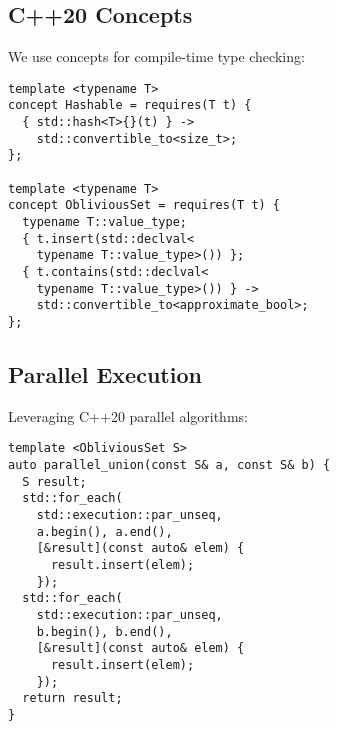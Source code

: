 \documentclass[10pt,conference]{IEEEtran}
\begin{document}
\subsection{C++20 Concepts}

We use concepts for compile-time type checking:

\begin{lstlisting}[caption={Type constraints using concepts}]
template <typename T>
concept Hashable = requires(T t) {
  { std::hash<T>{}(t) } ->
    std::convertible_to<size_t>;
};

template <typename T>
concept ObliviousSet = requires(T t) {
  typename T::value_type;
  { t.insert(std::declval<
    typename T::value_type>()) };
  { t.contains(std::declval<
    typename T::value_type>()) } ->
    std::convertible_to<approximate_bool>;
};
\end{lstlisting}

\subsection{Parallel Execution}

Leveraging C++20 parallel algorithms:

\begin{lstlisting}[caption={Parallel set operations}]
template <ObliviousSet S>
auto parallel_union(const S& a, const S& b) {
  S result;
  std::for_each(
    std::execution::par_unseq,
    a.begin(), a.end(),
    [&result](const auto& elem) {
      result.insert(elem);
    });
  std::for_each(
    std::execution::par_unseq,
    b.begin(), b.end(),
    [&result](const auto& elem) {
      result.insert(elem);
    });
  return result;
}
\end{lstlisting}
\end{document}
